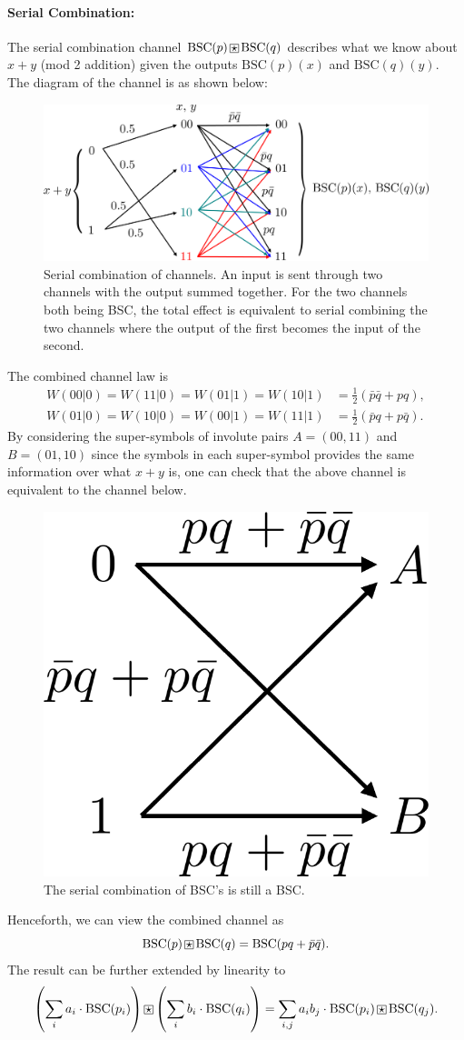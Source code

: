 \paragraph{Serial Combination:} The serial combination channel $\mathrm{BSC}(p)\boxstar\mathrm{BSC}(q)$ describes what we know about $x+y$ (mod 2 addition) given the outputs $\mathrm{BSC}(p)(x)$ and $\mathrm{BSC}(q)(y)$. The diagram of the channel is as shown below:
\begin{figure}[H]
    \centering
    \includegraphics[width=0.8\linewidth]{figures/w3_serial_combination.png}
    \caption{Serial combination of channels. An input is sent through two channels with the output summed together. For the two channels both being BSC, the total effect is equivalent to serial combining the two channels where the output of the first becomes the input of the second.}
    \label{fig:w3_serial}
\end{figure}
The combined channel law is
\begin{align*}
    W(00\vert0) = W(11\vert0) = W(01\vert1) = W(10\vert1) &= \frac{1}{2}(\bar{p}\bar{q}+pq),\\
    W(01\vert0) = W(10\vert0) = W(00\vert1) = W(11\vert1) &= \frac{1}{2}(\bar{p}q+p\bar{q}).
\end{align*}
By considering the super-symbols of involute pairs $A=(00,11)$ and $B=(01,10)$ since the symbols in each super-symbol provides the same information over what $x+y$ is, one can check that the above channel is equivalent to the channel below.
\begin{figure}[H]
    \centering
    \includegraphics[width=0.2\linewidth]{figures/w3_serial_combination_reduced.png}
    \caption{The serial combination of BSC's is still a BSC.}
\end{figure}
Henceforth, we can view the combined channel as
\begin{equation}
    \mathrm{BSC}(p)\boxstar\mathrm{BSC}(q) = \mathrm{BSC}(pq+\bar{p}\bar{q}).
\end{equation}
The result can be further extended by linearity to
\begin{equation}
    \left(\sum_i a_i \cdot \mathrm{BSC}(p_i)\right) \boxstar \left(\sum_i b_i \cdot \mathrm{BSC}(q_i)\right) = \sum_{i,j} a_ib_j \cdot\mathrm{BSC}(p_i)\boxstar\mathrm{BSC}(q_j).
\end{equation}

